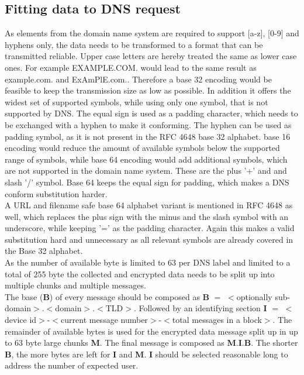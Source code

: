     \subsection{Fitting data to DNS request}
        \label{subsec:software_design:fitting}
        As elements from the domain name system are required to support [a-z], [0-9] and hyphens only, the data needs to be transformed to a format that can be transmitted reliable. Upper case letters are hereby treated the same as lower case ones.
        For example EXAMPLE.COM. would lead to the same result as example.com. and ExAmPlE.com..
        Therefore a base 32 encoding would be feasible to keep the transmission size as low as possible. In addition it offers the widest set of supported symbols, while using only one symbol, that is not supported by DNS. The equal sign is used as a padding character, which needs to be exchanged with a hyphen to make it conforming. The hyphen can be used as padding symbol, as it is not present in the RFC 4648 base 32 alphabet\cite{josefsson_simonjosefssonorg_base16_2006}. base 16 encoding would reduce the amount of available symbols below the supported range of symbols, while base 64 encoding would add additional symbols, which are not supported in the domain name system. These are the plus '+' and and slash '/' symbol. Base 64 keeps the equal sign for padding, which makes a DNS conform substitution harder.\\
        A URL and filename safe base 64 alphabet variant is mentioned in RFC 4648 as well, which replaces the plus sign with the minus and the slash symbol with an underscore, while keeping '=' as the padding character. Again this makes a valid substitution hard and unnecessary as all relevant symbols are already covered in the Base 32 alphabet\cite{josefsson_simonjosefssonorg_base16_2006}.\\
        
        As the number of available byte is limited to 63 per DNS label and limited to a total of 255 byte the collected and encrypted data needs to be split up into multiple chunks and multiple messages.\\
        The base (\textbf{B}) of every message should be composed as \textbf{B} $=$ $<$optionally sub-domain$>$.$<$domain$>$.$<$TLD$>$.
        Followed by an identifying section \textbf{I} $=$ $<$device id$>$-$<$current message number$>$-$<$total messages in a block$>$. 
        The remainder of available bytes is used for the encrypted data message split up in up to 63 byte large chunks \textbf{M}.
        The final message is composed as \textbf{M}.\textbf{I}.\textbf{B}. The shorter \textbf{B}, the more bytes are left for \textbf{I} and \textbf{M}. \textbf{I} should be selected reasonable long to address the number of expected user.\\
        
